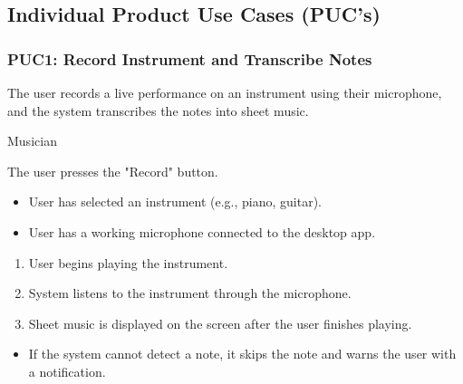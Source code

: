 \documentclass[12pt]{article}
\begin{document}
\subsection{Individual Product Use Cases (PUC's)}
\subsubsection*{PUC1: Record Instrument and Transcribe Notes}
\begin{description}[style=nextline]
    \item[Description:] The user records a live performance on an instrument using their microphone, and the system transcribes the notes into sheet music.
    \item[Primary Actor:] Musician
    \item[Trigger:] The user presses the "Record" button.
    \item[Preconditions:]
    \begin{itemize}
        \item User has selected an instrument (e.g., piano, guitar).
        \item User has a working microphone connected to the desktop app.
    \end{itemize}
    \item[Main Success Scenario:]
    \begin{enumerate}
        \item User begins playing the instrument.
        \item System listens to the instrument through the microphone.
        \item Sheet music is displayed on the screen after the user finishes playing.
    \end{enumerate}
    \item[Exceptions:]
    \begin{itemize}
        \item If the system cannot detect a note, it skips the note and warns the user with a notification.
    \end{itemize}
\end{description}
\end{document}
